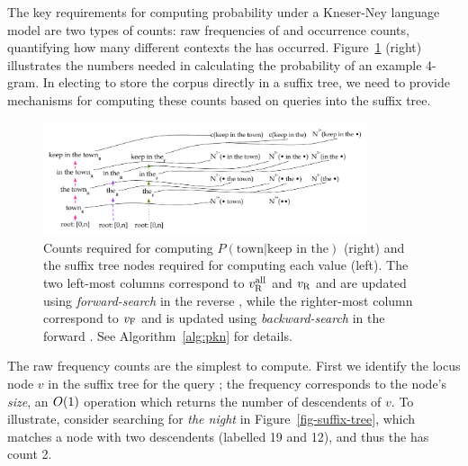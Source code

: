 
The key requirements for computing probability under a Kneser-Ney language model are two types of counts: raw frequencies of \ngrams and occurrence counts, quantifying how many different contexts the \ngram has occurred.
Figure~\ref{fig-counts-example} (right) illustrates the numbers needed in calculating the probability of an example 4-gram.
In electing to store the corpus directly in a suffix tree, we need to provide mechanisms for computing these counts based on queries into the suffix tree.

\begin{figure}[tpb]
\centering
\includegraphics[width=0.85\textwidth]{figures/kn_dual_cst}
\vspace{-3ex}
\caption{Counts required for computing $P(\text{town} | \text{keep in the})$ (right) and the suffix tree nodes required for computing each value (left). The two left-most columns correspond to $v_{\text{R}}^{\text{all}}$ and $v_{\text{R}}$ and are updated using \emph{forward-search} in the reverse \CST, while the righter-most column correspond to $v_{\text{F}}$ and is updated using \emph{backward-search} in the forward \CST. See Algorithm~\ref{alg:pkn} for details.}
\label{fig-counts-example}
\end{figure}


The raw frequency counts are the simplest to compute. First we
identify the locus node $v$ in the suffix tree for the query
\ngram; the frequency corresponds to the node's \emph{size}, an $O(1)$ 
operation which returns the number of descendents of $v$. To illustrate, consider
searching for \emph{the night} in  Figure~\ref{fig-suffix-tree}, which
matches a node with two descendents (labelled 19 and 12), and thus the
\ngram has count 2. 

